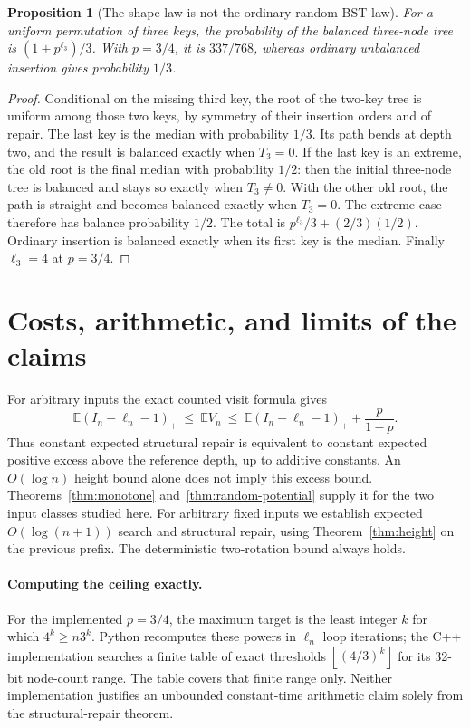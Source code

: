 \documentclass[11pt]{article}
\newtheorem{proposition}[theorem]{Proposition}
\newcommand{\E}{\mathbb E}
\newcommand{\floor}[1]{\left\lfloor #1\right\rfloor}
\begin{document}
\begin{proposition}[The shape law is not the ordinary random-BST law]\label{prop:shape}
For a uniform permutation of three keys, the probability of the balanced
three-node tree is $(1+p^{\ell_3})/3$. With $p=3/4$, it is $337/768$,
whereas ordinary unbalanced insertion gives probability $1/3$.
\end{proposition}
\begin{proof}
Conditional on the missing third key, the root of the two-key tree is uniform
among those two keys, by symmetry of their insertion orders and of repair.
The last key is the median with probability $1/3$. Its path bends at depth two,
and the result is balanced exactly when $T_3=0$.
If the last key is an extreme, the old root is the final median with probability
$1/2$: then the initial three-node tree is balanced and stays so exactly when
$T_3\ne0$. With the other old root, the path is straight and becomes balanced
exactly when $T_3=0$. The extreme case therefore has balance probability $1/2$.
The total is $p^{\ell_3}/3+(2/3)(1/2)$. Ordinary insertion is balanced exactly
when its first key is the median. Finally $\ell_3=4$ at $p=3/4$.
\end{proof}

\section{Costs, arithmetic, and limits of the claims}\label{sec:arithmetic}
For arbitrary inputs the exact counted visit formula gives
\begin{equation}
 \E(I_n-\ell_n-1)_+\ \le\ \E V_n\ \le\
 \E(I_n-\ell_n-1)_++\frac{p}{1-p}.                           \label{eq:excess}
\end{equation}
Thus constant expected structural repair is equivalent to constant expected
positive excess above the reference depth, up to additive constants. An
$O(\log n)$ height bound alone does not imply this excess bound.
Theorems~\ref{thm:monotone} and~\ref{thm:random-potential} supply it for the two
input classes studied here. For arbitrary fixed inputs we establish expected
$O(\log(n+1))$ search and structural repair, using Theorem~\ref{thm:height}
on the previous prefix. The deterministic two-rotation bound always holds.

\paragraph{Computing the ceiling exactly.}
For the implemented $p=3/4$, the maximum target is the least integer $k$ for
which $4^k\ge n3^k$. Python recomputes these powers in $\ell_n$ loop iterations;
the C++ implementation searches a finite table of exact thresholds
$\floor{(4/3)^k}$ for its 32-bit node-count range. The table covers that finite
range only. Neither implementation justifies an unbounded constant-time
arithmetic claim solely from the structural-repair theorem.
\end{document}
